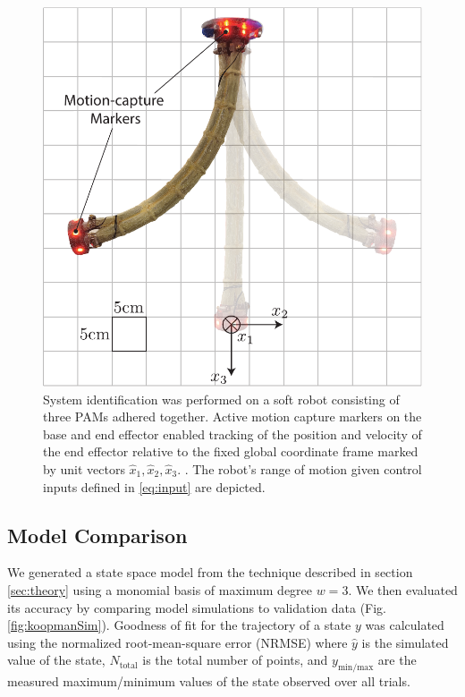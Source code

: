 \begin{figure}
    \centering
    \includegraphics[width=\linewidth]{figures/flaccyDiagram_bothways_v2.pdf}
    \caption{System identification was performed on a soft robot consisting of three PAMs adhered together. 
        Active motion capture markers on the base and end effector enabled tracking of the position and velocity of the end effector relative to the fixed global coordinate frame marked by unit vectors $\hat{x}_1,\hat{x}_2,\hat{x}_3$. . The robot's range of motion given control inputs defined in \eqref{eq:input} are depicted.}
    \label{fig:flaccy}
\end{figure}


\subsection{Model Comparison}
\label{sec:modelcomparison}

We generated a state space model from the technique described in section \ref{sec:theory} using a monomial basis of maximum degree $w=3$.
We then evaluated its accuracy by comparing model simulations to validation data (Fig. \ref{fig:koopmanSim}).
Goodness of fit for the trajectory of a state $y$ was calculated using the normalized root-mean-square error (NRMSE)
where $\hat{y}$ is the simulated value of the state, $N_\text{total}$ is the total number of points, and $y_{\text{min/max}}$ are the measured maximum/minimum values of the state observed over all trials.


